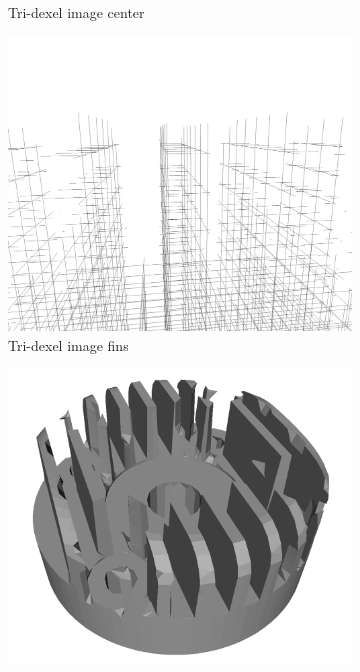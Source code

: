 \begin{figure}
\begin{subfigure}[t]{0.32\textwidth}
		\caption{Tri-dexel image center}
		\label{fig:cylinder_head_dexel_image_center}
	\end{subfigure}
	\begin{subfigure}[t]{0.32\textwidth}
		\centering
		\includegraphics[width=\textwidth]{images/cylinder_head_dexel_image_fins}
		\caption{Tri-dexel image fins}
		\label{fig:cylinder_head_dexel_image_fins}
	\end{subfigure}
	\begin{subfigure}[t]{0.32\textwidth}
		\centering
		\includegraphics[width=\textwidth]{images/cylinder_head_reconstructed}

\end{subfigure}
\end{figure}
